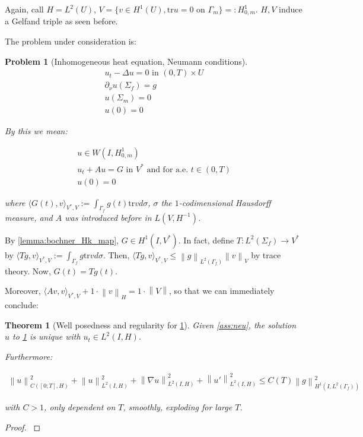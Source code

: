 \documentclass[english,a4paper,9pt,oneside]{scrbook}	%
\theoremstyle{break}
\newtheorem{thm}[equation]{Theorem}
\newtheorem{pb}[equation]{Problem}
\newenvironment{mproof}[1][\proofname]{%
  \begin{proof}[#1]$ $\par\nobreak\ignorespaces
}{%
  \end{proof}
}
\renewcommand*{\proofname}{Proof}
\theoremstyle{remark}
\newcommand{\norm}[1]{\left\lVert#1\right\rVert}
\newcommand{\HN}[1]{\norm{#1}_{H}}
\newcommand{\VN}[1]{\norm{#1}_{V}}
\newcommand{\tr}{\text{tr}}
\begin{document}
\begin{appendices}
Again, call $H=L^2(U)$, $V=\{ v \in H^1(U), \tr u = 0 \text{ on } \Gamma_m\}=:H^1_{0,m}$. $H,V$ induce a Gelfand triple as seen before. 


The problem under consideration is:

\begin{pb}[Inhomogeneous heat equation, Neumann conditions]
\label{pb:neu}
\begin{align}
u_t - \Delta u = 0 \text{ in } (0,T)\times U\\
\partial_\nu u(\Sigma_f)=g\\
u(\Sigma_m)=0\\
u(0)=0
\end{align}

By this we mean:

\begin{align}
u \in W(I,H^1_{0,m}) \\
u_t + A u = G \text{ in } V^* \text{ and for a.e. } t \in (0,T) \\
u(0)=0
\end{align}

where $\langle G(t), v \rangle_{V^*,V}:=\int_{\Gamma_f} g(t)\tr v d\sigma$, $\sigma$ the $1$-codimensional Hausdorff measure, and $A$ was introduced before in $L(V,H^{-1})$.

\end{pb}

By \cref{lemma:bochner_Hk_map}, $G \in H^1(I,V^*)$. In fact, define $T: L^2(\Sigma_f)\rightarrow V^*$ by $\langle Tg,v \rangle_{V^*,V}:=\int_{\Gamma_f} g\tr v d\sigma$. Then, $\langle Tg,v \rangle_{V^*,V} \leq \norm{g}_{L^2(\Gamma_f)} \VN{v}$ by trace theory. Now, $G(t)=Tg(t)$.

Moreover, $\langle A v, v \rangle_{V^*,V}+ 1 \cdot \HN{v} = 1\cdot \norm{V}$, so that we can immediately conclude:

\begin{thm}[Well posedness and regularity for \cref{pb:neu}]
\label{prop:wp_neu}
Given \cref{ass:neu}, the solution $u$ to \cref{pb:neu} is unique with $u_t \in L^2(I,H)$.

Furthermore: 

\begin{align}
\norm{u}^2_{C([0;T],H)}+\norm{u}_{L^2(I,H)}^2+ \norm{\nabla u}_{L^2(I,H)}^2 + \norm{u'}^2_{L^2(I,H)}\leq C(T)\norm{g}_{H^1(I,L^2(\Gamma_f))}^2
\end{align}

with $C>1$, only dependent on $T$, smoothly, exploding for large $T$.
\end{thm}
\begin{mproof}


\end{mproof}
\end{appendices}
\end{document}
